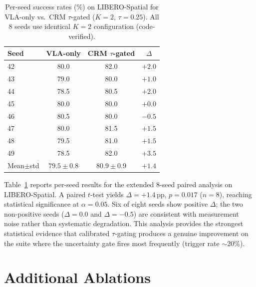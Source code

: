 \begin{table}[h]
\centering
\caption{Per-seed success rates (\%) on LIBERO-Spatial for VLA-only vs.\ CRM $\tau$-gated ($K{=}2$, $\tau{=}0.25$). All 8 seeds use identical $K{=}2$ configuration (code-verified).}
\label{tab:8seed}
\small
\begin{tabular}{lccc}
\toprule
Seed & VLA-only & CRM $\tau$-gated & $\Delta$ \\
\midrule
42 & 80.0 & 82.0 & $+2.0$ \\
43 & 79.0 & 80.0 & $+1.0$ \\
44 & 78.5 & 80.5 & $+2.0$ \\
45 & 80.0 & 80.0 & $+0.0$ \\
46 & 80.5 & 80.0 & $-0.5$ \\
47 & 80.0 & 81.5 & $+1.5$ \\
48 & 79.5 & 81.0 & $+1.5$ \\
49 & 78.5 & 82.0 & $+3.5$ \\
\midrule
Mean$\pm$std & $79.5 \pm 0.8$ & $80.9 \pm 0.9$ & $+1.4$ \\
\bottomrule
\end{tabular}
\end{table}

 Table~\ref{tab:8seed} reports per-seed results for the extended 8-seed paired analysis on LIBERO-Spatial. A paired $t$-test yields $\Delta{=}{+}1.4$\,pp, $p{=}0.017$ ($n{=}8$), reaching statistical significance at $\alpha{=}0.05$. Six of eight seeds show positive $\Delta$; the two non-positive seeds ($\Delta{=}0.0$ and $\Delta{=}{-}0.5$) are consistent with measurement noise rather than systematic degradation. This analysis provides the strongest statistical evidence that calibrated $\tau$-gating produces a genuine improvement on the suite where the uncertainty gate fires most frequently (trigger rate ${\sim}$20\%).


\section{Additional Ablations}
\label{sec:additional_ablations}

